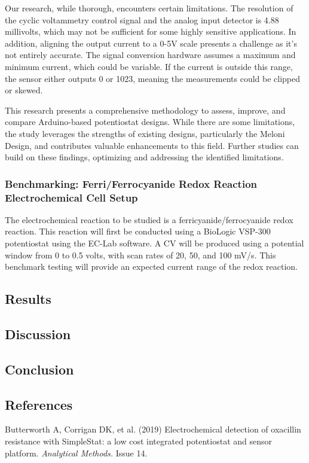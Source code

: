 \documentclass{article}
\begin{document}
Our research, while thorough, encounters certain limitations. The resolution of the cyclic voltammetry control signal and the analog input detector is 4.88 millivolts, which may not be sufficient for some highly sensitive applications. In addition, aligning the output current to a 0-5V scale presents a challenge as it's not entirely accurate. The signal conversion hardware assumes a maximum and minimum current, which could be variable. If the current is outside this range, the sensor either outputs 0 or 1023, meaning the measurements could be clipped or skewed.

This research presents a comprehensive methodology to assess, improve, and compare Arduino-based potentiostat designs. While there are some limitations, the study leverages the strengths of existing designs, particularly the Meloni Design, and contributes valuable enhancements to this field. Further studies can build on these findings, optimizing and addressing the identified limitations.

\subsubsection*{Benchmarking: Ferri/Ferrocyanide Redox Reaction Electrochemical Cell Setup}

The electrochemical reaction to be studied is a ferricyanide/ferrocyanide redox reaction. This reaction will first be conducted using a BioLogic VSP-300 potentiostat using the EC-Lab software. A CV will be produced using a potential window from 0 to 0.5 volts, with scan rates of 20, 50, and 100 mV/s. This benchmark testing will provide an expected current range of the redox reaction. 

\subsection*{Results}

\subsection*{Discussion}
\subsection*{Conclusion}

\subsection*{References}
Butterworth A, Corrigan DK, et al. (2019) Electrochemical detection of oxacillin resistance with SimpleStat: a low cost integrated potentiostat and sensor platform. \emph{Analytical Methods.} Issue 14. 
\end{document}
